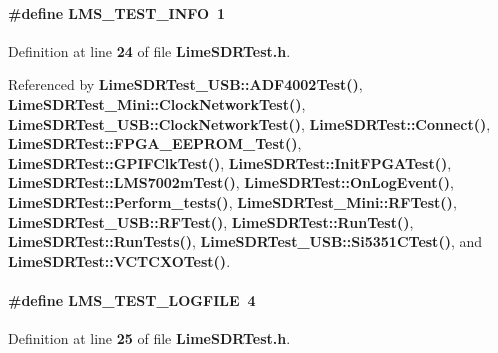 \paragraph[{L\+M\+S\+\_\+\+T\+E\+S\+T\+\_\+\+I\+N\+FO}]{\setlength{\rightskip}{0pt plus 5cm}\#define L\+M\+S\+\_\+\+T\+E\+S\+T\+\_\+\+I\+N\+FO~1}\label{LimeSDRTest_8h_a38f8182bb045551269200cd84b636fa3}


Definition at line {\bf 24} of file {\bf Lime\+S\+D\+R\+Test.\+h}.



Referenced by {\bf Lime\+S\+D\+R\+Test\+\_\+\+U\+S\+B\+::\+A\+D\+F4002\+Test()}, {\bf Lime\+S\+D\+R\+Test\+\_\+\+Mini\+::\+Clock\+Network\+Test()}, {\bf Lime\+S\+D\+R\+Test\+\_\+\+U\+S\+B\+::\+Clock\+Network\+Test()}, {\bf Lime\+S\+D\+R\+Test\+::\+Connect()}, {\bf Lime\+S\+D\+R\+Test\+::\+F\+P\+G\+A\+\_\+\+E\+E\+P\+R\+O\+M\+\_\+\+Test()}, {\bf Lime\+S\+D\+R\+Test\+::\+G\+P\+I\+F\+Clk\+Test()}, {\bf Lime\+S\+D\+R\+Test\+::\+Init\+F\+P\+G\+A\+Test()}, {\bf Lime\+S\+D\+R\+Test\+::\+L\+M\+S7002m\+Test()}, {\bf Lime\+S\+D\+R\+Test\+::\+On\+Log\+Event()}, {\bf Lime\+S\+D\+R\+Test\+::\+Perform\+\_\+tests()}, {\bf Lime\+S\+D\+R\+Test\+\_\+\+Mini\+::\+R\+F\+Test()}, {\bf Lime\+S\+D\+R\+Test\+\_\+\+U\+S\+B\+::\+R\+F\+Test()}, {\bf Lime\+S\+D\+R\+Test\+::\+Run\+Test()}, {\bf Lime\+S\+D\+R\+Test\+::\+Run\+Tests()}, {\bf Lime\+S\+D\+R\+Test\+\_\+\+U\+S\+B\+::\+Si5351\+C\+Test()}, and {\bf Lime\+S\+D\+R\+Test\+::\+V\+C\+T\+C\+X\+O\+Test()}.

\paragraph[{L\+M\+S\+\_\+\+T\+E\+S\+T\+\_\+\+L\+O\+G\+F\+I\+LE}]{\setlength{\rightskip}{0pt plus 5cm}\#define L\+M\+S\+\_\+\+T\+E\+S\+T\+\_\+\+L\+O\+G\+F\+I\+LE~4}\label{LimeSDRTest_8h_a10f136cdc495de4c1ec21972f8494570}


Definition at line {\bf 25} of file {\bf Lime\+S\+D\+R\+Test.\+h}.



